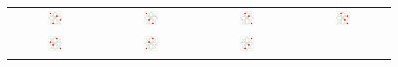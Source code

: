 \documentclass[sn-mathphys]{sn-jnl}%
\theoremstyle{thmstyleone}%
\theoremstyle{thmstyletwo}%
\theoremstyle{thmstylethree}%
\begin{document}
\begin{figure}[h]%
\begin{center}
\begin{tabular}{ c c c c}
\includegraphics[width=0.2\textwidth]{2020-ghz-exfigures-figure3}
&
\includegraphics[width=0.2\textwidth]{2020-ghz-exfigures-figure4}
&
\includegraphics[width=0.2\textwidth]{2020-ghz-exfigures-figure5}
&
\includegraphics[width=0.2\textwidth]{2020-ghz-exfigures-figure6}
\\
\includegraphics[width=0.2\textwidth]{2020-ghz-exfigures-figure7}
&
\includegraphics[width=0.2\textwidth]{2020-ghz-exfigures-figure8}
&
\includegraphics[width=0.2\textwidth]{2020-ghz-exfigures-figure9}

\end{tabular}
\end{center}
\end{figure}
\end{document}
